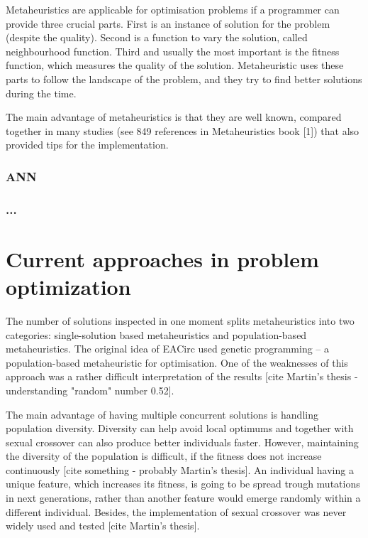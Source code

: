 \documentclass[
  print, %
  Table,   %
  nolof,     %
  nolot,     %
  11pt, %
  oneside  %
]{fithesis3}
\begin{document}
Metaheuristics are applicable for optimisation problems if a programmer can provide three crucial parts. First is an instance of solution for the problem (despite the quality). Second is a function to vary the solution, called neighbourhood function. Third and usually the most important is the fitness function, which measures the quality of the solution. Metaheuristic uses these parts to follow the landscape of the problem, and they try to find better solutions during the time.

The main advantage of metaheuristics is that they are well known, compared together in many studies (see 849 references in Metaheuristics book [1]) that also provided tips for the implementation.

\subsection{ANN}

\subsection{...}

\chapter{Current approaches in problem optimization}

The number of solutions inspected in one moment splits metaheuristics into two categories: single-solution based metaheuristics and population-based metaheuristics. The original idea of EACirc used genetic programming -- a population-based metaheuristic for optimisation. One of the weaknesses of this approach was a rather difficult interpretation of the results [cite Martin's thesis - understanding "random" number 0.52].

The main advantage of having multiple concurrent solutions is handling population diversity. Diversity can help avoid local optimums and together with sexual crossover can also produce better individuals faster. However, maintaining the diversity of the population is difficult, if the fitness does not increase continuously [cite something - probably Martin's thesis]. An individual having a unique feature, which increases its fitness, is going to be spread trough mutations in next generations, rather than another feature would emerge randomly within a different individual. Besides, the implementation of sexual crossover was never widely used and tested [cite Martin's thesis].
\end{document}
